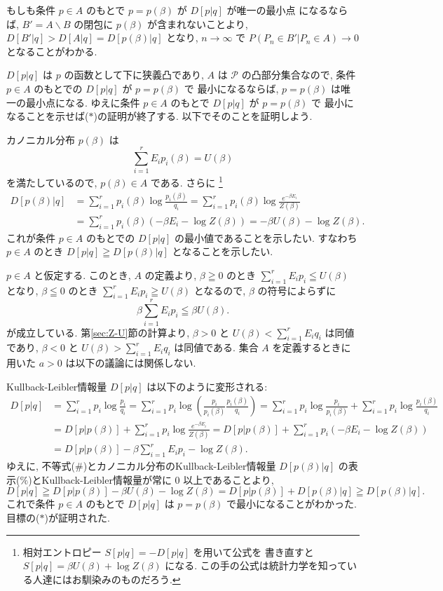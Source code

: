 \documentclass[12pt,twoside]{jarticle}
\renewcommand\setminus{\smallsetminus}
\newcommand\cP{{\mathcal P}}
\theoremstyle{definition} %
\theoremstyle{definition} %
\theoremstyle{definition} %
\numberwithin{theorem}{section}
\numberwithin{equation}{section}
\numberwithin{figure}{section}
\numberwithin{table}{section}
\newcommand\secref[1]{第\ref{#1}節}
\begin{document}
もしも条件 $p\in A$ のもとで $p=p(\beta)$ が $D[p|q]$ が唯一の最小点
になるならば, $B'=A\setminus B$ の閉包に $p(\beta)$ が含まれないことより,
$D[B'|q]>D[A|q]=D[p(\beta)|q]$ となり,  $n\to\infty$ で
$P(P_n\in B'|P_n\in A)\to 0$ となることがわかる.

$D[p|q]$ は $p$ の函数として下に狭義凸であり, 
$A$ は $\cP$ の凸部分集合なので, 
条件 $p\in A$ のもとでの $D[p|q]$ が $p=p(\beta)$ で
最小になるならば, $p=p(\beta)$ は唯一の最小点になる. 
ゆえに条件 $p\in A$ のもとで $D[p|q]$ が $p=p(\beta)$ で
最小になることを示せば($*$)の証明が終了する.
以下でそのことを証明しよう.

カノニカル分布 $p(\beta)$ は
\[
\sum_{i=1}^r E_i p_i(\beta) = U(\beta)
\]
を満たしているので, $p(\beta)\in A$ である. さらに%
\footnote{相対エントロピー $S[p|q]=-D[p|q]$ を用いて公式を
書き直すと $S[p|q]=\beta U(\beta) + \log Z(\beta)$ になる.
この手の公式は統計力学を知っている人達にはお馴染みのものだろう.}
\begin{align*}
D[p(\beta)|q]
&
=\sum_{i=1}^r p_i(\beta)\log\frac{p_i(\beta)}{q_i}
=\sum_{i=1}^r p_i(\beta)\log\frac{e^{-\beta E_i}}{Z(\beta)}
\\ &
=\sum_{i=1}^r p_i(\beta)(- \beta E_i - \log Z(\beta))
=-\beta U(\beta)-\log Z(\beta).
\tag{$\%$}
\end{align*}
これが条件 $p\in A$ のもとでの $D[p|q]$ の最小値であることを示したい.
すなわち $p\in A$ のとき $D[p|q]\geqq D[p(\beta)|q]$ となることを示したい.

$p\in A$ と仮定する. このとき, $A$ の定義より, 
$\beta\geqq 0$ のとき $\sum_{i=1}^r E_i p_i\leqq U(\beta)$ となり, 
$\beta\leqq 0$ のとき $\sum_{i=1}^r E_i p_i\geqq U(\beta)$ となるので,
$\beta$ の符号によらずに
\[
\beta\sum_{i=1}^r E_i p_i \leqq \beta U(\beta).
\tag{$\#$}
\]
が成立している. 
\secref{sec:Z-U}の計算より, 
$\beta>0$ と $U(\beta)<\sum_{i=1}^r E_i q_i$ は同値であり, 
$\beta<0$ と $U(\beta)>\sum_{i=1}^r E_i q_i$ は同値である.
集合 $A$ を定義するときに用いた $a>0$ は以下の議論には関係しない.

Kullback-Leibler情報量 $D[p|q]$ は以下のように変形される:
\begin{align*}
D[p|q]
&
=\sum_{i=1}^r p_i\log\frac{p_i}{q_i}
=\sum_{i=1}^r p_i\log\left(\frac{p_i}{p_i(\beta)}\frac{p_i(\beta)}{q_i}\right)
=\sum_{i=1}^r p_i\log\frac{p_i}{p_i(\beta)}
+\sum_{i=1}^r p_i\log\frac{p_i(\beta)}{q_i}
\\ &
=D[p|p(\beta)]+\sum_{i=1}^r p_i\log\frac{e^{-\beta E_i}}{Z(\beta)}
=D[p|p(\beta)]+\sum_{i=1}^r p_i(-\beta E_i-\log Z(\beta))
\\ &
=D[p|p(\beta)]-\beta\sum_{i=1}^r E_i p_i - \log Z(\beta).
\end{align*}
ゆえに, 不等式($\#$)とカノニカル分布のKullback-Leibler情報量 $D[p(\beta)|q]$
の表示($\%$)とKullback-Leibler情報量が常に $0$ 以上であることより, 
\[
D[p|q]
\geqq D[p|p(\beta)] -\beta U(\beta)-\log Z(\beta) 
= D[p|p(\beta)] + D[p(\beta)|q]
\geqq D[p(\beta)|q].
\]
これで条件 $p\in A$ のもとで $D[p|q]$ は $p=p(\beta)$ で最小になることがわかった.
目標の($*$)が証明された.
\end{document}
